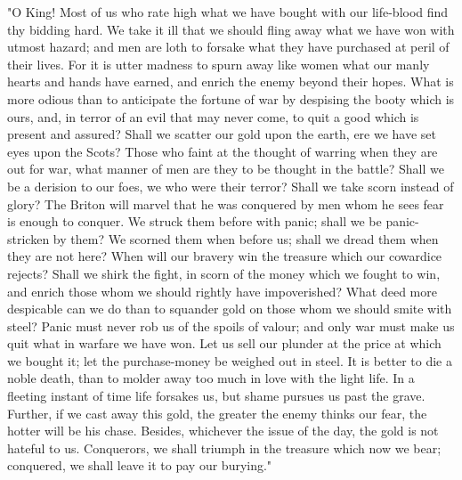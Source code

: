 \documentclass[10pt,a4paper]{report}
\begin{document}
"O King! Most of us who rate high what we have bought with our life-blood find thy bidding hard. We take it ill that we should fling away what we have won with utmost hazard; and men are loth to forsake what they have purchased at peril of their lives. For it is utter madness to spurn away like women what our manly hearts and hands have earned, and enrich the enemy beyond their hopes. What is more odious than to anticipate the fortune of war by despising the booty which is ours, and, in terror of an evil that may never come, to quit a good which is present and assured? Shall we scatter our gold upon the earth, ere we have set eyes upon the Scots? Those who faint at the thought of warring when they are out for war, what manner of men are they to be thought in the battle? Shall we be a derision to our foes, we who were their terror? Shall we take scorn instead of glory? The Briton will marvel that he was conquered by men whom he sees fear is enough to conquer. We struck them before with panic; shall we be panic-stricken by them? We scorned them when before us; shall we dread them when they are not here? When will our bravery win the treasure which our cowardice rejects? Shall we shirk the fight, in scorn of the money which we fought to win, and enrich those whom we should rightly have impoverished? What deed more despicable can we do than to squander gold on those whom we should smite with steel? Panic must never rob us of the spoils of valour; and only war must make us quit what in warfare we have won. Let us sell our plunder at the price at which we bought it; let the purchase-money be weighed out in steel. It is better to die a noble death, than to molder away too much in love with the light life. In a fleeting instant of time life forsakes us, but shame pursues us past the grave. Further, if we cast away this gold, the greater the enemy thinks our fear, the hotter will be his chase. Besides, whichever the issue of the day, the gold is not hateful to us. Conquerors, we shall triumph in the treasure which now we bear; conquered, we shall leave it to pay our burying."\\
\end{document}
